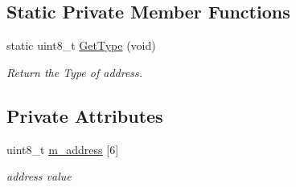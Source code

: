 \subsection*{Static Private Member Functions}
\begin{DoxyCompactItemize}
\item 
static uint8\+\_\+t \hyperlink{classns3_1_1Mac48Address_a5d365853b58b7acb2cc1cf905115891b}{Get\+Type} (void)
\begin{DoxyCompactList}\small\item\em Return the Type of address. \end{DoxyCompactList}\end{DoxyCompactItemize}
\subsection*{Private Attributes}
\begin{DoxyCompactItemize}
\item 
uint8\+\_\+t \hyperlink{classns3_1_1Mac48Address_aa2427c5c0d9cab0de54a2a8bf5fa59c5}{m\+\_\+address} \mbox{[}6\mbox{]}
\begin{DoxyCompactList}\small\item\em address value \end{DoxyCompactList}\end{DoxyCompactItemize}
